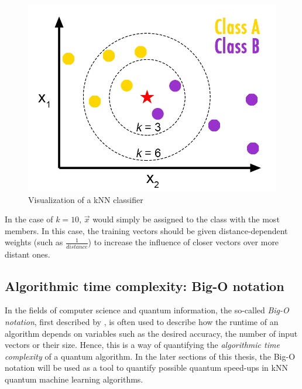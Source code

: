 \begin{figure}[H]
      \centering
       \includegraphics[scale=0.8]{img/knn-concept.png}
       \caption[]{\label{fig:knnconcept} Visualization of a kNN classifier\footnotemark[4]}
\end{figure}


In the case of $k = 10$, $\vec{x}$ would simply be assigned to the class with the most members. In this case, the training vectors should be given distance-dependent weights (such as $\frac{1}{distance}$) to increase the influence of closer vectors over more distant ones.

\subsection{Algorithmic time complexity: Big-O notation}
\label{subsubsec:algcomplexity}

In the fields of computer science and quantum information, the so-called \emph{Big-O notation}, first described by , is often used to describe how the runtime of an algorithm depends on variables such as the desired accuracy, the number of input vectors or their size. Hence, this is a way of quantifying the \emph{algorithmic time complexity} of a quantum algorithm. In the later sections of this thesis, the Big-O notation will be used as a tool to quantify possible quantum speed-ups in kNN quantum machine learning algorithms.

